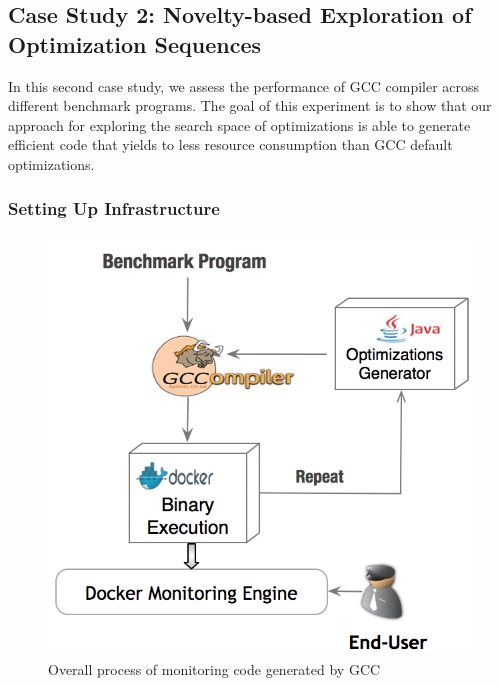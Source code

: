 \subsection{Case Study 2: Novelty-based Exploration of Optimization Sequences}
In this second case study, we assess the performance of GCC compiler across different benchmark programs. The goal of this experiment is to show that our approach for exploring the search space of optimizations is able to generate efficient code that yields to less resource consumption than GCC default optimizations.
\subsubsection{Setting Up Infrastructure}
\begin{figure}[b]
	\centering
	\includegraphics[scale=0.50]{Ressources/infra_novelty.png}
	\caption{Overall process of monitoring code generated by GCC}
	
	
\end{figure}
